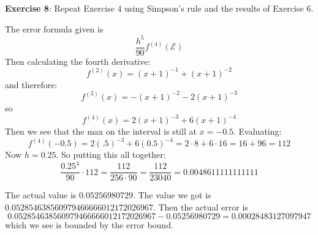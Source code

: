 \documentclass{article}
\begin{document}
\textbf{Exercise 8}: Repeat Exercise $4$ using Simpson's rule and the results of Exercise $6$.
    \begin{answer}
        The error formula given is
            \begin{equation*}
                \dfrac{h^{5}}{90}f^{(4)}(\mathcal{E})
            \end{equation*}
        Then calculating the fourth derivative:
            \begin{equation*}
                f^{(2)}(x) = (x + 1)^{-1} + (x + 1)^{-2}
            \end{equation*}
        and therefore:
            \begin{equation*}
                f^{(3)}(x) = -(x + 1)^{-2} -2(x + 1)^{-3}
            \end{equation*}
        so
            \begin{equation*}
                f^{(4)}(x) = 2(x + 1)^{-3} + 6(x + 1)^{-4}
            \end{equation*}
        Then we see that the max on the interval is still at $x = -0.5$. Evaluating:
            \begin{equation*}
                f^{(4)}(-0.5) = 2(.5)^{-3} + 6(0.5)^{-4} = 2 \cdot 8 + 6 \cdot 16 = 16 + 96 = 112
            \end{equation*}
        Now $h = 0.25$. So putting this all together:
            \begin{equation*}
                \dfrac{0.25^{4}}{90} \cdot 112 = \dfrac{112}{256 \cdot 90} = \dfrac{112}{23040} = 0.0048611111111111
            \end{equation*}

        The actual value is $0.05256980729$. The value we got is $0.052854638560979466666012172026967$. Then the actual error is
            \begin{equation*}
                0.052854638560979466666012172026967 - 0.05256980729 = 0.00028483127097947
            \end{equation*}
        which we see is bounded by the error bound.
    \end{answer}
\end{document}

